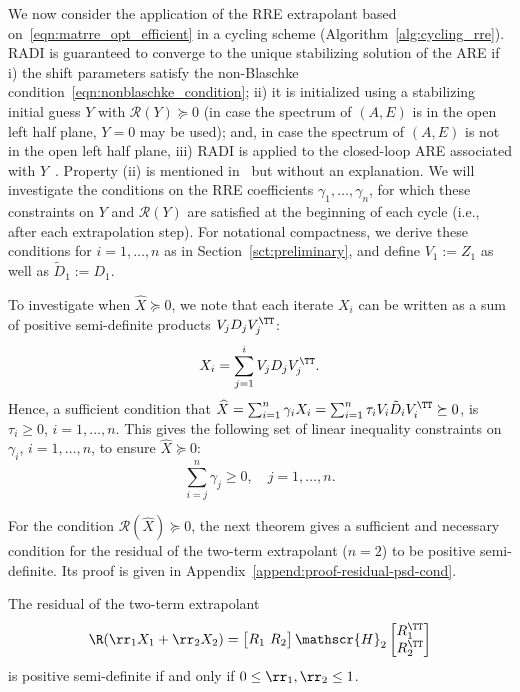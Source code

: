 We now consider the application of the \ac{RRE} extrapolant based on~\eqref{eqn:matrre_opt_efficient} in a cycling scheme (Algorithm~\ref{alg:cycling_rre}).
RADI is guaranteed to converge to the unique stabilizing solution of the \ac{ARE} if
i) the shift parameters satisfy the non-Blaschke condition~\eqref{eqn:nonblaschke_condition}; %
ii)\label{item:psd_residual} it is initialized using a stabilizing initial guess $Y$ with $\mathscr{R}(Y) \succeq 0$ (in case the spectrum of $(A, E)$ is in the open left half plane, $Y = 0$ may be used); %
and, in case the spectrum of $(A, E)$ is not in the open left half plane,
iii) RADI is applied to the closed-loop \ac{ARE} associated with $Y$~\cite{massoudi2016analysis}. %
Property (ii) is mentioned in~\cite[p.~308]{benner2018radi} but without an explanation.
We will investigate the conditions on the \ac{RRE} coefficients $\gamma_1, \ldots, \gamma_n$, for which these constraints on $Y$ and $\mathscr{R}(Y)$ are satisfied at the beginning of each cycle (i.e., after each extrapolation step).
For notational compactness,
we derive these conditions for $i=1,\dots,n$ as in Section~\ref{sct:preliminary},
and define $V_1 := Z_1$ as well as $\tilde D_1 := D_1$.

To investigate when $\widehat{X} \succeq 0$, we note that each iterate $X_i$ can be written as a sum of positive semi-definite products $V_j D_j V_j^\TT$:
\begin{equation}
	X_i = \sum_{j=1}^{i} V_j D_j V_j^\TT.
\end{equation}
Hence, a sufficient condition that $\widehat{X} = \sum_{i=1}^{n} \gamma_i X_i = \sum_{i=1}^{n} \tau_i V_i \tilde D_i V_i^\TT \succeq 0$, is $\tau_i \geq 0$, $i = 1, \ldots, n$.
This gives the following set of linear inequality constraints on $\gamma_i$, $i = 1, \ldots, n$, to ensure $\widehat{X} \succeq 0$:
\begin{equation}
	\sum_{i=j}^{n} \gamma_j \geq 0, \quad j = 1, \ldots, n.
	\label{eqn:matrre_gamma_bounds_X1}
\end{equation}

For the condition $\mathscr{R}(\widehat{X}) \succeq 0$, the next theorem gives a sufficient and necessary condition for the residual of the two-term extrapolant ($n = 2$) to be positive semi-definite.
Its proof is given in Appendix~\ref{append:proof-residual-psd-cond}.
\begin{thm}\label{thm:residual-psd-cond}
The residual of the two-term extrapolant
\begin{equation*}
	\R(\rr_1X_1 + \rr_2X_2) =
	\begin{bmatrix}
		R_1 \ R_2
	\end{bmatrix}\mathscr{H}_2\begin{bmatrix}
		R_1^\TT \\ R_2^\TT
	\end{bmatrix}
\end{equation*}
is positive semi-definite if and only if $0\le \rr_1,\rr_2\le 1$.
\end{thm}

